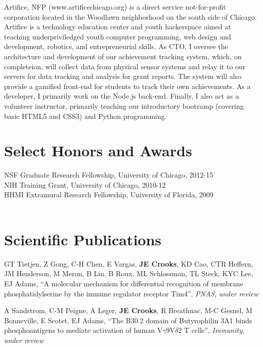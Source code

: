 \documentclass[margin,line]{resume}
\begin{document}
\begin{resume}
    Artifice, NFP (www.artificechicago.org) is a direct service not-for-profit corporation located in the Woodlawn neighborhood on the south side of Chicago.  Artifice is a technology education center and youth hackerspace aimed at teaching underpriviledged youth computer programming, web design and development, robotics, and entrepreneurial skills.  As CTO, I oversee the architecture and development of our achievement tracking system, which, on completeion, will collect data from physical sensor systems and relay it to our servers for data tracking and analysis for grant reports.  The system will also provide a gamified front-end for students to track their own achievements.  As a developer, I primarily work on the Node.js back-end. Finally, I also act as a volunteer instructor, primarily teaching our introductory bootcamp (covering basic HTML5 and CSS3) and Python programming.
    \vspace{-2mm}

    \section{\mysidestyle Select Honors and Awards} 
    NSF Graduate Research Fellowship, University of Chicago, 2012-15 \vspace{1mm} \\
    NIH Training Grant, University of Chicago, 2010-12 \vspace{1mm}\\
    HHMI Extramural Research Fellowship, University of Florida, 2009  \vspace{1mm}\\
    \vspace{-8mm}\\

    \section{\mysidestyle Scientific Publications}
    GT Tietjen, Z Gong, C-H Chen, E Vargas, \textbf{JE Crooks}, KD Cao, CTR Heffern, JM Henderson, M Meron, B Lin, B Roux, ML Schlossman, TL Steck, KYC Lee, EJ Adams,
    ``A molecular mechanism for differential recognition of membrane phosphatidylserine by the immune regulator receptor Tim4'',
    \textsl{PNAS}, \emph{under review}
    \vspace{-3mm}

    A Sandstrom, C-M Peigne, A Leger, \textbf{JE Crooks}, R Breathnac, M-C Gesnel, M Bonneville, E Scotet, EJ Adams,
    ``The B30.2 domain of Butyrophilin 3A1 binds phosphoantigens to mediate activation of human V$\gamma$9V$\delta$2 T cells'',
    \textsl{Immunity}, \emph{under review}
    \vspace{-3mm}


\end{resume}
\end{document}
